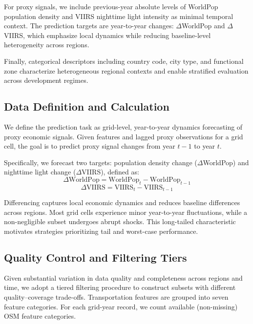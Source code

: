 \documentclass[pdflatex,sn-basic,Numbered]{sn-jnl}
\begin{document}
For proxy signals, we include previous-year absolute levels of WorldPop population density and VIIRS nighttime light intensity as minimal temporal context. The prediction targets are year-to-year changes: $\Delta$WorldPop and $\Delta$VIIRS, which emphasize local dynamics while reducing baseline-level heterogeneity across regions.

Finally, categorical descriptors including country code, city type, and functional zone characterize heterogeneous regional contexts and enable stratified evaluation across development regimes.



\subsection{Data Definition and Calculation}

We define the prediction task as grid-level, year-to-year dynamics forecasting of proxy economic signals. Given features and lagged proxy observations for a grid cell, the goal is to predict proxy signal changes from year $t-1$ to year $t$.

Specifically, we forecast two targets: population density change ($\Delta$WorldPop) and nighttime light change ($\Delta$VIIRS), defined as:
\begin{equation}
    \Delta \text{WorldPop} = \text{WorldPop}_t - \text{WorldPop}_{t-1}
\end{equation}
\begin{equation}
        \Delta \text{VIIRS} = \text{VIIRS}_t - \text{VIIRS}_{t-1}
\end{equation}

Differencing captures local economic dynamics and reduces baseline differences across regions. Most grid cells experience minor year-to-year fluctuations, while a non-negligible subset undergoes abrupt shocks. This long-tailed characteristic motivates strategies prioritizing tail and worst-case performance.

\subsection{Quality Control and Filtering Tiers}

Given substantial variation in data quality and completeness across regions and time, we adopt a tiered filtering procedure to construct subsets with different quality–coverage trade-offs. Transportation features are grouped into seven feature categories. For each grid-year record, we count available (non-missing) OSM feature categories.
\end{document}
